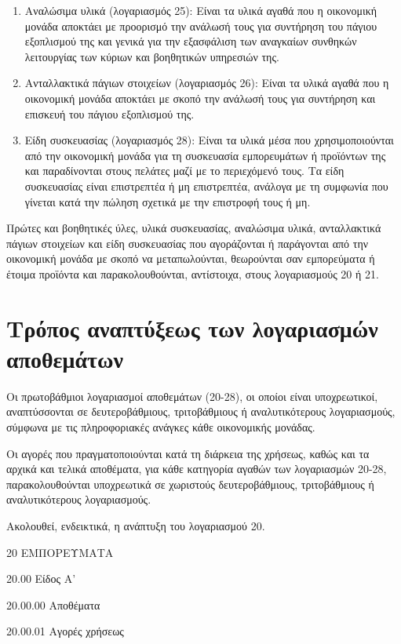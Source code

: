 \documentclass[A4,10pt,greek]{book}
\begin{document}
\begin{enumerate}
\item Αναλώσιμα υλικά (λογαριασμός 25): Είναι τα υλικά αγαθά που η οικονομική μονάδα αποκτάει με προορισμό την ανάλωσή τους για συντήρηση του πάγιου εξοπλισμού της και γενικά για την εξασφάλιση των αναγκαίων συνθηκών λειτουργίας των κύριων και βοηθητικών υπηρεσιών της.

\item Ανταλλακτικά πάγιων στοιχείων (λογαριασμός 26): Είναι τα υλικά αγαθά που η οικονομική μονάδα αποκτάει με σκοπό την ανάλωσή τους για συντήρηση και επισκευή του πάγιου εξοπλισμού της.

\item Είδη συσκευασίας (λογαριασμός 28): Είναι τα υλικά μέσα που χρησιμοποιούνται από την οικονομική μονάδα για τη συσκευασία εμπορευμάτων ή προϊόντων της και παραδίνονται στους πελάτες μαζί με το περιεχόμενό τους. Τα είδη συσκευασίας είναι επιστρεπτέα ή μη επιστρεπτέα, ανάλογα με τη συμφωνία που γίνεται κατά την πώληση σχετικά με την επιστροφή τους ή μη.

\end{enumerate}

Πρώτες και βοηθητικές ύλες, υλικά συσκευασίας, αναλώσιμα υλικά, ανταλλακτικά πάγιων στοιχείων και είδη συσκευασίας που αγοράζονται ή παράγονται από την οικονομική μονάδα με σκοπό να μεταπωλούνται, θεωρούνται σαν εμπορεύματα ή έτοιμα προϊόντα και παρακολουθούνται, αντίστοιχα, στους λογαριασμούς 20 ή 21.

\section{Τρόπος αναπτύξεως των λογαριασμών αποθεμάτων}

Οι πρωτοβάθμιοι λογαριασμοί αποθεμάτων (20-28), οι οποίοι είναι υποχρεωτικοί, αναπτύσσονται σε δευτεροβάθμιους, τριτοβάθμιους ή αναλυτικότερους λογαριασμούς, σύμφωνα με τις πληροφοριακές ανάγκες κάθε οικονομικής μονάδας.

Οι αγορές που πραγματοποιούνται κατά τη διάρκεια της χρήσεως, καθώς και τα αρχικά και τελικά αποθέματα, για κάθε κατηγορία αγαθών των λογαριασμών 20-28, παρακολουθούνται υποχρεωτικά σε χωριστούς δευτεροβάθμιους, τριτοβάθμιους ή αναλυτικότερους λογαριασμούς.

Ακολουθεί, ενδεικτικά, η ανάπτυξη του λογαριασμού 20.

20    ΕΜΠΟΡΕΥΜΑΤΑ

20.00   Είδος Α'

20.00.00    Αποθέματα

20.00.01    Αγορές χρήσεως
\end{document}
